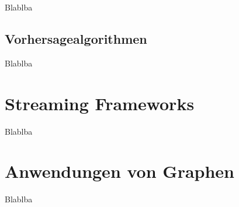 Blablba

\subsection{Vorhersagealgorithmen}
\label{section:cluster computing}

Blablba

\section{Streaming Frameworks}
\label{section:cluster computing}

Blablba

\section{Anwendungen von Graphen}
\label{section:cluster computing}

Blablba